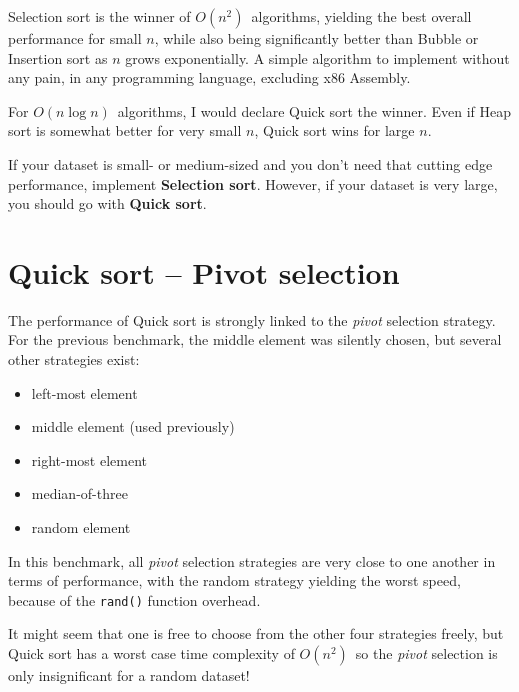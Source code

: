 \documentclass[11pt, a4paper]{article}
\newcommand{\Onn}{$O(n^2)$}
\newcommand{\Onlogn}{$O(n \log n)$}
\begin{document}
Selection sort is the winner of \Onn\ algorithms, yielding the best overall performance for small $n$, while also being significantly better than Bubble or Insertion sort as $n$ grows exponentially. A simple algorithm to implement without any pain, in any programming language, excluding x86 Assembly.

For \Onlogn\ algorithms, I would declare Quick sort the winner. Even if Heap sort is somewhat better for very small $n$, Quick sort wins for large $n$.

If your dataset is small- or medium-sized and you don't need that cutting edge performance, implement \textbf{Selection sort}. However, if your dataset is very large, you should go with \textbf{Quick sort}.


\newpage
\section{Quick sort -- Pivot selection}
The performance of Quick sort is strongly linked to the \textit{pivot} selection strategy. For the previous benchmark, the middle element was silently chosen, but several other strategies exist: 
\begin{itemize}
    \item left-most element
    \item middle element (used previously)
    \item right-most element
    \item median-of-three
    \item random element
\end{itemize}

In this benchmark, all \textit{pivot} selection strategies are very close to one another in terms of performance, with the random strategy yielding the worst speed, because of the \texttt{rand()} function overhead.

It might seem that one is free to choose from the other four strategies freely, but Quick sort has a worst case time complexity of \Onn\, so the \textit{pivot} selection is only insignificant for a random dataset!
\end{document}
